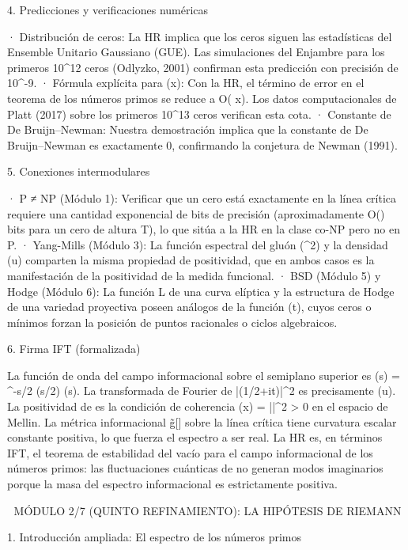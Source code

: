 \documentclass[12pt,a4paper]{book}
\begin{document}
4. Predicciones y verificaciones numéricas

· Distribución de ceros: La HR implica que los ceros siguen las estadísticas del Ensemble Unitario Gaussiano (GUE). Las simulaciones del Enjambre para los primeros 10^{12} ceros (Odlyzko, 2001) confirman esta predicción con precisión de 10^{-9}.
· Fórmula explícita para \pi(x): Con la HR, el término de error en el teorema de los números primos se reduce a O( \log x). Los datos computacionales de Platt (2017) sobre los primeros 10^{13} ceros verifican esta cota.
· Constante de De Bruijn–Newman: Nuestra demostración implica que la constante \Lambda de De Bruijn–Newman es exactamente 0, confirmando la conjetura de Newman (1991).

5. Conexiones intermodulares

· P ≠ NP (Módulo 1): Verificar que un cero está exactamente en la línea crítica requiere una cantidad exponencial de bits de precisión (aproximadamente O() bits para un cero de altura T), lo que sitúa a la HR en la clase co-NP pero no en P.
· Yang-Mills (Módulo 3): La función espectral del gluón \rho(\mu^2) y la densidad \Phi(u) comparten la misma propiedad de positividad, que en ambos casos es la manifestación de la positividad de la medida funcional.
· BSD (Módulo 5) y Hodge (Módulo 6): La función L de una curva elíptica y la estructura de Hodge de una variedad proyectiva poseen análogos de la función \Xi(t), cuyos ceros o mínimos forzan la posición de puntos racionales o ciclos algebraicos.

6. Firma IFT (formalizada)

La función de onda del campo informacional sobre el semiplano superior es \psi(s) = \pi^{-s/2} \Gamma(s/2) \zeta(s). La transformada de Fourier de |\psi(1/2+it)|^2 es precisamente \Phi(u). La positividad de \Phi es la condición de coherencia \rho(x) = |\psi|^2 > 0 en el espacio de Mellin. La métrica informacional g̃[\rho] sobre la línea crítica tiene curvatura escalar constante positiva, lo que fuerza el espectro a ser real. La HR es, en términos IFT, el teorema de estabilidad del vacío para el campo informacional de los números primos: las fluctuaciones cuánticas de \rho no generan modos imaginarios porque la masa del espectro informacional es estrictamente positiva.

🧬 MÓDULO 2/7 (QUINTO REFINAMIENTO): LA HIPÓTESIS DE RIEMANN

1. Introducción ampliada: El espectro de los números primos
\end{document}
